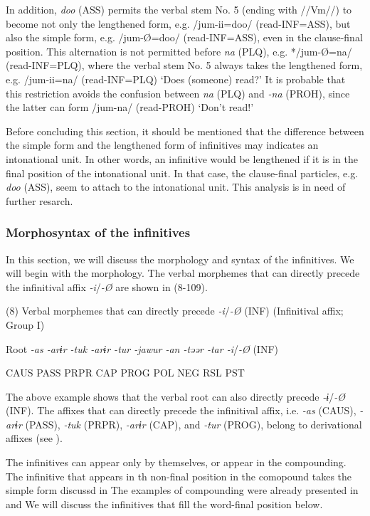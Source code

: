  In addition, \textit{doo} (ASS) permits the verbal stem No. 5 (ending with //Vm//) to become not only the lengthened form, e.g. /jum-ii=doo/ (read-INF=ASS), but also the simple form, e.g. /jum-Ø=doo/ (read-INF=ASS), even in the clause-final position. This alternation is not permitted before \textit{na} (PLQ), e.g. */jum-Ø=na/ (read-INF=PLQ), where the verbal stem No. 5 always takes the lengthened form, e.g. /jum-ii=na/ (read-INF=PLQ) ‘Does (someone) read?’ It is probable that this restriction avoids the confusion between \textit{na} (PLQ) and \textit{{}-na} (PROH), since the latter can form /jum-na/ (read-PROH) ‘Don’t read!’

  Before concluding this section, it should be mentioned that the difference between the simple form and the lengthened form of infinitives may indicates an intonational unit. In other words, an infinitive would be lengthened if it is in the final position of the intonational unit. In that case, the clause-final particles, e.g. \textit{doo} (ASS), seem to attach to the intonational unit. This analysis is in need of further resarch.

\subsubsection{Morphosyntax of the infinitives}

In this section, we will discuss the morphology and syntax of the infinitives. We will begin with the morphology. The verbal morphemes that can directly precede the infinitival affix \textit{{}-i}/\textit{{}-Ø} are shown in (8-109).

(8)  Verbal morphemes that can directly precede \textit{{}-i}/\textit{{}-Ø} (INF) (Infinitival affix; Group I)

  Root  \textit{{}-as  {}-arɨr  {}-tuk  {}-arɨr  {}-tur  {}-jawur  {}-an  {}-təər  {}-tar  {}-i}/\textit{{}-Ø} (INF)

    CAUS  PASS  PRPR  CAP  PROG  POL  NEG  RSL  PST  

The above example shows that the verbal root can also directly precede \textit{{}-ɨ}/\textit{{}-Ø} (INF). The affixes that can directly precede the infinitival affix, i.e. \textit{{}-as} (CAUS), \textit{{}-arɨr} (PASS), \textit{{}-tuk} (PRPR), \textit{{}-arɨr} (CAP), and \textit{{}-tur} (PROG), belong to derivational affixes (see ).

  The infinitives can appear only by themselves, or appear in the compounding. The infinitive that appears in th non-final position in the comopound takes the simple form discussd in  The examples of compounding were already presented in  and  We will discuss the infinitives that fill the word-final position below.

